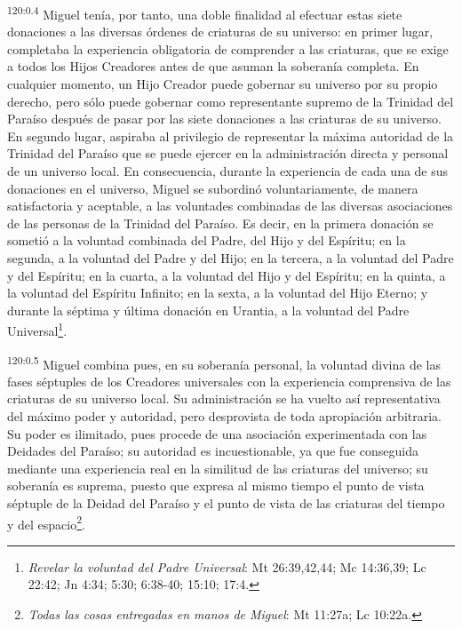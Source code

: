 \par 
\textsuperscript{120:0.4} Miguel tenía, por tanto, una doble finalidad al efectuar estas siete donaciones a las diversas órdenes de criaturas de su universo: en primer lugar, completaba la experiencia obligatoria de comprender a las criaturas, que se exige a todos los Hijos Creadores antes de que asuman la soberanía completa. En cualquier momento, un Hijo Creador puede gobernar su universo por su propio derecho, pero sólo puede gobernar como representante supremo de la Trinidad del Paraíso después de pasar por las siete donaciones a las criaturas de su universo. En segundo lugar, aspiraba al privilegio de representar la máxima autoridad de la Trinidad del Paraíso que se puede ejercer en la administración directa y personal de un universo local. En consecuencia, durante la experiencia de cada una de sus donaciones en el universo, Miguel se subordinó voluntariamente, de manera satisfactoria y aceptable, a las voluntades combinadas de las diversas asociaciones de las personas de la Trinidad del Paraíso. Es decir, en la primera donación se sometió a la voluntad combinada del Padre, del Hijo y del Espíritu; en la segunda, a la voluntad del Padre y del Hijo; en la tercera, a la voluntad del Padre y del Espíritu; en la cuarta, a la voluntad del Hijo y del Espíritu; en la quinta, a la voluntad del Espíritu Infinito; en la sexta, a la voluntad del Hijo Eterno; y durante la séptima y última donación en Urantia, a la voluntad del Padre Universal\footnote{\textit{Revelar la voluntad del Padre Universal}: Mt 26:39,42,44; Mc 14:36,39; Lc 22:42; Jn 4:34; 5:30; 6:38-40; 15:10; 17:4.}.

\par 
\textsuperscript{120:0.5} Miguel combina pues, en su soberanía personal, la voluntad divina de las fases séptuples de los Creadores universales con la experiencia comprensiva de las criaturas de su universo local. Su administración se ha vuelto así representativa del máximo poder y autoridad, pero desprovista de toda apropiación arbitraria. Su poder es ilimitado, pues procede de una asociación experimentada con las Deidades del Paraíso; su autoridad es incuestionable, ya que fue conseguida mediante una experiencia real en la similitud de las criaturas del universo; su soberanía es suprema, puesto que expresa al mismo tiempo el punto de vista séptuple de la Deidad del Paraíso y el punto de vista de las criaturas del tiempo y del espacio\footnote{\textit{Todas las cosas entregadas en manos de Miguel}: Mt 11:27a; Lc 10:22a.}.

